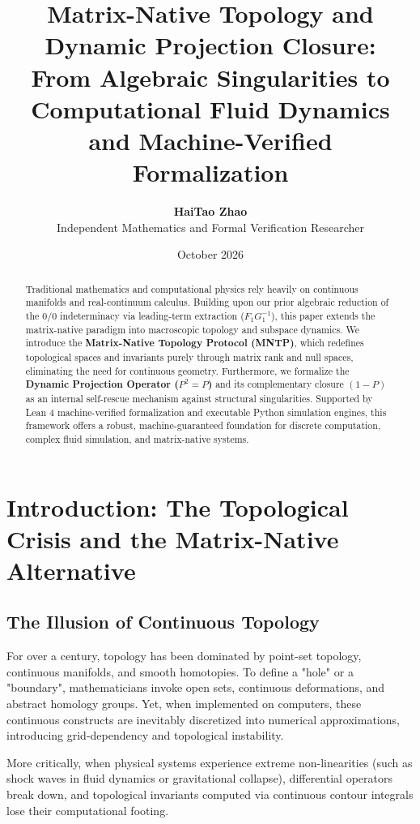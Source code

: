 \documentclass[11pt,a4paper]{article}
\title{\textbf{Matrix-Native Topology and Dynamic Projection Closure:} \\ From Algebraic Singularities to Computational Fluid Dynamics and Machine-Verified Formalization}
\author{\textbf{HaiTao Zhao} \\ Independent Mathematics and Formal Verification Researcher}
\date{October 2026}
\begin{document}
\maketitle

\begin{abstract}
Traditional mathematics and computational physics rely heavily on continuous manifolds and real-continuum calculus. Building upon our prior algebraic reduction of the $0/0$ indeterminacy via leading-term extraction ($F_1 G_1^{-1}$), this paper extends the matrix-native paradigm into macroscopic topology and subspace dynamics. We introduce the \textbf{Matrix-Native Topology Protocol (MNTP)}, which redefines topological spaces and invariants purely through matrix rank and null spaces, eliminating the need for continuous geometry. Furthermore, we formalize the \textbf{Dynamic Projection Operator ($P^2 = P$)} and its complementary closure $(1-P)$ as an internal self-rescue mechanism against structural singularities. Supported by Lean 4 machine-verified formalization and executable Python simulation engines, this framework offers a robust, machine-guaranteed foundation for discrete computation, complex fluid simulation, and matrix-native systems.
\end{abstract}

\section{Introduction: The Topological Crisis and the Matrix-Native Alternative}

\subsection{The Illusion of Continuous Topology}
For over a century, topology has been dominated by point-set topology, continuous manifolds, and smooth homotopies. To define a "hole" or a "boundary", mathematicians invoke open sets, continuous deformations, and abstract homology groups. Yet, when implemented on computers, these continuous constructs are inevitably discretized into numerical approximations, introducing grid-dependency and topological instability.

More critically, when physical systems experience extreme non-linearities (such as shock waves in fluid dynamics or gravitational collapse), differential operators break down, and topological invariants computed via continuous contour integrals lose their computational footing. 
\end{document}
